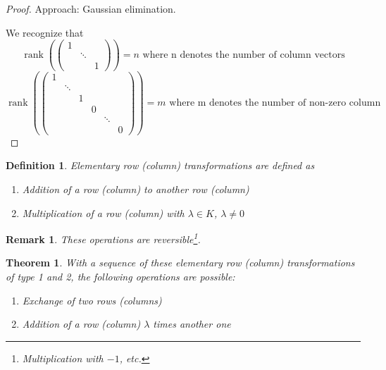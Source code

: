 \documentclass[a4paper,landscape,twocolumn]{article}
\newtheorem{theorem}{Theorem}
\newtheorem{defi}{Definition}
\newtheorem{rem}{Remark}
\DeclareMathOperator\rank{rank} %
\begin{document}
\begin{proof}
  Approach: Gaussian elimination.

  We recognize that
  \[
    \rank\left(
    \begin{pmatrix}
      1 &  & \\
        & \ddots & \\
        &  & 1
    \end{pmatrix}\right)
    = n \text{ where n denotes the number of column vectors}
  \] \[
    \rank\left(
    \begin{pmatrix}
      1 &        &   &   &        & \\
        & \ddots &   &   &        & \\
        &        & 1 &   &        & \\
        &        &   & 0 &        & \\
        &        &   &   & \ddots & \\
        &        &   &   &        & 0
    \end{pmatrix}\right)
    = m \text{ where m denotes the number of non-zero column}
  \]
\end{proof}
%
\begin{defi}
  \label{defi-6.22}
  Elementary row (column) transformations are defined as
  \begin{enumerate}
    \item[1.] Addition of a row (column) to another row (column)
    \item[2.] Multiplication of a row (column) with $\lambda \in K$, $\lambda \neq 0$
  \end{enumerate}
\end{defi}
\begin{rem}
  These operations are reversible\footnote{Multiplication with $-1$, etc.}.
\end{rem}
%
\begin{theorem}
  \label{satz-6.23}
  With a sequence of these elementary row (column) transformations of type 1 and 2,
  the following operations are possible:
  \begin{enumerate}
    \item[3.] Exchange of two rows (columns)
    \item[4.] Addition of a row (column) $\lambda$ times another one
  \end{enumerate}
\end{theorem}
\end{document}
